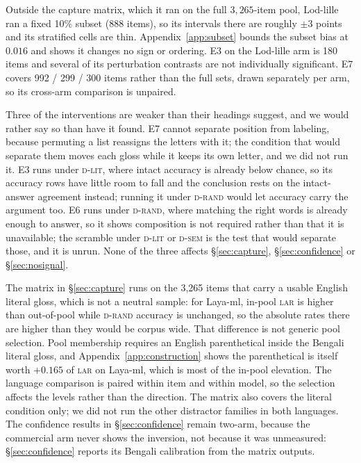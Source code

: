 \documentclass[11pt]{article}
\newcommand{\Drand}{\textsc{d-rand}}
\newcommand{\Dsem}{\textsc{d-sem}}
\newcommand{\Dlit}{\textsc{d-lit}}
\newcommand{\LAR}{\textsc{lar}}
\begin{document}
Outside the capture matrix, which it ran on the full $3{,}265$-item pool,
Lod-lille ran a fixed 10\% subset (888 items), so its intervals there are roughly
$\pm 3$ points and its stratified cells are thin. Appendix~\ref{app:subset}
bounds the subset bias at $0.016$ and shows it changes no sign or ordering. E3
on the Lod-lille arm is 180 items and several of its perturbation contrasts are
not individually significant. E7 covers 992 / 299 / 300 items rather than the
full sets, drawn separately per arm, so its cross-arm comparison is unpaired.

Three of the interventions are weaker than their headings suggest, and we would
rather say so than have it found. E7 cannot separate position from labeling,
because permuting a list reassigns the letters with it; the condition that would
separate them moves each gloss while it keeps its own letter, and we did not run
it. E3 runs under \Dlit, where intact accuracy is already below chance, so its
accuracy rows have little room to fall and the conclusion rests on the
intact-answer agreement instead; running it under \Drand{} would let accuracy
carry the argument too. E6 runs under \Drand, where matching the right words is
already enough to answer, so it shows composition is not required rather than
that it is unavailable; the scramble under \Dlit{} or \Dsem{} is the test that
would separate those, and it is unrun. None of the three affects
\S\ref{sec:capture}, \S\ref{sec:confidence} or \S\ref{sec:nosignal}.

The matrix in \S\ref{sec:capture} runs on the 3{,}265 items that carry a usable
English literal gloss, which is not a neutral sample: for Laya-ml, in-pool \LAR{}
is higher than out-of-pool while \Drand{} accuracy is unchanged, so the absolute
rates there are higher than they would be corpus wide. That difference is not
generic pool selection. Pool membership requires an English parenthetical inside
the Bengali literal gloss, and Appendix~\ref{app:construction} shows the
parenthetical is itself worth $+0.165$ of \LAR{} on Laya-ml, which is most of the
in-pool elevation. The language comparison is paired within item and within model,
so the selection affects the levels rather than the direction. The matrix also covers
the literal condition only; we did not run the other distractor families in both
languages. The confidence results in \S\ref{sec:confidence} remain two-arm,
because the commercial arm never shows the inversion, not because it was
unmeasured: \S\ref{sec:confidence} reports its Bengali calibration from the matrix
outputs.
\end{document}
